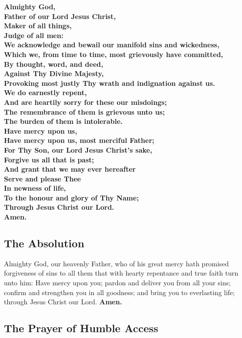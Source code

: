 \textbf{Almighty God,\\
Father of our Lord Jesus Christ,\\
Maker of all things,\\
Judge of all men:\\
We acknowledge and bewail our manifold sins and wickedness,\\
Which we, from time to time, most grievously have committed,\\
By thought, word, and deed,\\
Against Thy Divine Majesty,\\
Provoking most justly Thy wrath and indignation against us.\\
We do earnestly repent,\\
And are heartily sorry for these our misdoings;\\
The remembrance of them is grievous unto us;\\
The burden of them is intolerable.\\
Have mercy upon us,\\
Have mercy upon us, most merciful Father;\\
For Thy Son, our Lord Jesus Christ's sake,\\
Forgive us all that is past;\\
And grant that we may ever hereafter\\
Serve and please Thee\\
In newness of life,\\
To the honour and glory of Thy Name;\\
Through Jesus Christ our Lord.\\
Amen.}

\subsection{The Absolution}

Almighty God, our heavenly Father, who of his great mercy hath promised
forgiveness of sins to all them that with hearty repentance and true faith turn
unto him: Have mercy upon you; \cross pardon and deliver you from all your sins;
confirm and strengthen you in all goodness; and bring you to everlasting life;
through Jesus Christ our Lord. \textbf{Amen.}

\subsection{The Prayer of Humble Access}

